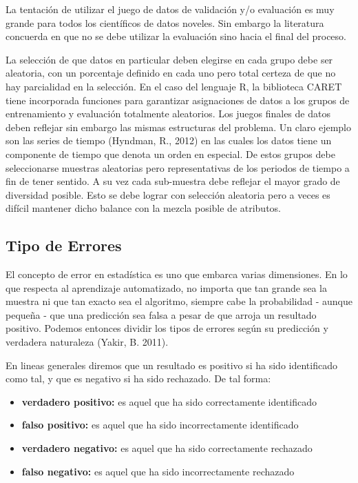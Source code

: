 \documentclass[letterpaper, spanish, 11pt]{report}
\begin{document}
La tentación de utilizar el juego de datos de validación y/o evaluación es muy grande para todos los científicos de datos noveles. Sin embargo la literatura concuerda en que no se debe utilizar la evaluación sino hacia el final del proceso. 

La selección de que datos en particular deben elegirse en cada grupo debe ser aleatoria, con un porcentaje definido en cada uno pero total certeza de que no hay parcialidad en la selección. En el caso del lenguaje R, la biblioteca CARET tiene incorporada funciones para garantizar asignaciones de datos a los grupos de entrenamiento y evaluación totalmente aleatorios. Los juegos finales de datos deben reflejar sin embargo las mismas estructuras del problema. Un claro ejemplo son las series de tiempo (Hyndman, R., 2012) en las cuales los datos tiene un componente de tiempo que denota un orden en especial. De estos grupos debe seleccionarse muestras aleatorias pero representativas de los periodos de tiempo a fin de tener sentido. A su vez cada sub-muestra debe reflejar el mayor grado de diversidad posible. Esto se debe lograr con selección aleatoria pero a veces es difícil mantener dicho balance con la mezcla posible de atributos.

\subsection{Tipo de Errores}
El concepto de error en estadística es uno que embarca varias dimensiones. En lo que respecta al aprendizaje automatizado, no importa que tan grande sea la muestra ni que tan exacto sea el algoritmo, siempre cabe la probabilidad - aunque pequeña - que una predicción sea falsa a pesar de que arroja un resultado positivo. Podemos entonces dividir los tipos de errores según su predicción y verdadera naturaleza (Yakir, B. 2011). 

En lineas generales diremos que un resultado es positivo si ha sido identificado como tal, y que es negativo si ha sido rechazado. De tal forma:
\begin{itemize}
	\item \textbf{verdadero positivo:} es aquel que ha sido correctamente identificado
	\item \textbf{falso positivo:} es aquel que ha sido incorrectamente identificado
	\item \textbf{verdadero negativo:} es aquel que ha sido correctamente rechazado
	\item \textbf{falso negativo:} es aquel que ha sido incorrectamente rechazado
\end{itemize}
\end{document}
